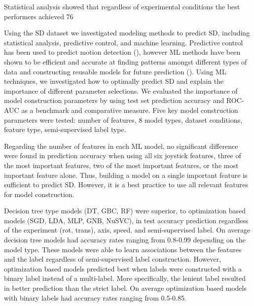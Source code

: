 \documentclass[11pt, onecolumn]{article}
\begin{document}
Statistical analysis showed that regardless of experimental conditions the best performers achieved 76%

Using the SD dataset we investigated modeling methods to predict SD, including statistical analysis, predictive control, and machine learning.  Predictive control has been used to predict motion detection (\cite{Soyka_2011_Predicting}), however ML methods have been shown to be efficient and accurate at finding patterns amongst different types of data and constructing reusable models for future prediction (\cite{Burkov_2019_ML}).  Using ML techniques, we investigated how to optimally predict SD and explain the importance of different parameter selections.  We evaluated the importance of model construction parameters by using test set prediction accuracy and ROC-AUC as a benchmark and comparative measure.  Five key model construction parameters were tested: number of features, 8 model types, dataset conditions, feature type, semi-supervised label type.

Regarding the number of features in each ML model, no significant difference were found in prediction accuracy when using all six joystick features, three of the most important features, two of the most important features, or the most important feature alone. Thus, building a model on a single important feature is sufficient to predict SD.  However, it is a best practice to use all relevant features for model construction.

Decision tree type models (DT, GBC, RF) were superior, to optimization based models (SGD, LDA, MLP, GNB, NuSVC), in test accuracy prediction regardless of the experiment (rot, trans), axis, speed, and semi-supervised label.  On average decision tree models had accuracy rates ranging from 0.8-0.99 depending on the model type.  These models were able to learn associations between the features and the label regardless of semi-supervised label construction.  However, optimization based models predicted best when labels were constructed with a binary label instead of a multi-label.  More specifically, the lenient label resulted in better prediction than the strict label.  On average optimization based models with binary labels had accuracy rates ranging from 0.5-0.85. 
\end{document}
